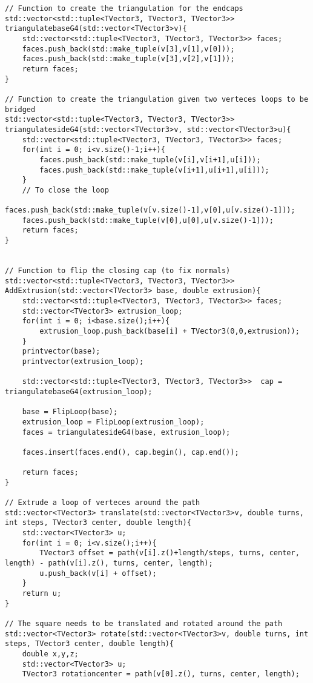 \begin{lstlisting}
// Function to create the triangulation for the endcaps
std::vector<std::tuple<TVector3, TVector3, TVector3>> triangulatebaseG4(std::vector<TVector3>v){
    std::vector<std::tuple<TVector3, TVector3, TVector3>> faces;
    faces.push_back(std::make_tuple(v[3],v[1],v[0]));
    faces.push_back(std::make_tuple(v[3],v[2],v[1]));
    return faces;
}

// Function to create the triangulation given two verteces loops to be bridged
std::vector<std::tuple<TVector3, TVector3, TVector3>> triangulatesideG4(std::vector<TVector3>v, std::vector<TVector3>u){
    std::vector<std::tuple<TVector3, TVector3, TVector3>> faces;
    for(int i = 0; i<v.size()-1;i++){
        faces.push_back(std::make_tuple(v[i],v[i+1],u[i]));
        faces.push_back(std::make_tuple(v[i+1],u[i+1],u[i]));
    }
    // To close the loop
    faces.push_back(std::make_tuple(v[v.size()-1],v[0],u[v.size()-1]));
    faces.push_back(std::make_tuple(v[0],u[0],u[v.size()-1]));
    return faces;
}


// Function to flip the closing cap (to fix normals)
std::vector<std::tuple<TVector3, TVector3, TVector3>> AddExtrusion(std::vector<TVector3> base, double extrusion){
    std::vector<std::tuple<TVector3, TVector3, TVector3>> faces;
    std::vector<TVector3> extrusion_loop;
    for(int i = 0; i<base.size();i++){
        extrusion_loop.push_back(base[i] + TVector3(0,0,extrusion));
    }
    printvector(base);
    printvector(extrusion_loop);
   
    std::vector<std::tuple<TVector3, TVector3, TVector3>>  cap = triangulatebaseG4(extrusion_loop);

    base = FlipLoop(base);
    extrusion_loop = FlipLoop(extrusion_loop);
    faces = triangulatesideG4(base, extrusion_loop);

    faces.insert(faces.end(), cap.begin(), cap.end());

    return faces;
}

// Extrude a loop of verteces around the path
std::vector<TVector3> translate(std::vector<TVector3>v, double turns, int steps, TVector3 center, double length){
    std::vector<TVector3> u;
    for(int i = 0; i<v.size();i++){
        TVector3 offset = path(v[i].z()+length/steps, turns, center, length) - path(v[i].z(), turns, center, length);
        u.push_back(v[i] + offset);
    }
    return u;
}

// The square needs to be translated and rotated around the path
std::vector<TVector3> rotate(std::vector<TVector3>v, double turns, int steps, TVector3 center, double length){
    double x,y,z;
    std::vector<TVector3> u;
    TVector3 rotationcenter = path(v[0].z(), turns, center, length);
    

\end{lstlisting}
